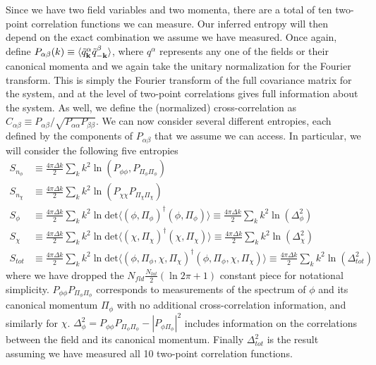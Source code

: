 \documentclass[11pt,a4paper]{article}
\def\det{\mathrm{det}}
\begin{document}
Since we have two field variables and two momenta, there are a total of ten two-point correlation functions we can measure.
Our inferred entropy will then depend on the exact combination we assume we have measured.
Once again, define $P_{\alpha\beta}(k) \equiv \langle \tilde{q}^{\alpha}_{\bf k}\tilde{q}^{\beta}_{-\bf k}\rangle$, where $q^{\alpha}$ represents any one of the fields or their canonical momenta and we again take the unitary normalization for the Fourier transform.
This is simply the Fourier transform of the full covariance matrix for the system, and at the level of two-point correlations gives full information about the system.
As well, we define the (normalized) cross-correlation as $C_{\alpha\beta} \equiv P_{\alpha\beta}/\sqrt{P_{\alpha\alpha}P_{\beta\beta}}$.
We can now consider several different entropies, each defined by the components of $P_{\alpha\beta}$ that we assume we can access.
In particular, we will consider the following five entropies
\begin{align}
  S_{n_\phi}  &\equiv \frac{4\pi\Delta k}{2}\sum_kk^2\ln(P_{\phi\phi},P_{\Pi_\phi\Pi_\phi}) \label{eqn:entropy_nphi} \\
  S_{n_\chi}  &\equiv \frac{4\pi\Delta k}{2}\sum_kk^2\ln(P_{\chi\chi}P_{\Pi_\chi\Pi_\chi}) \label{eqn:entropy_nchi} \\
  S_{\phi}  &\equiv \frac{4\pi\Delta k}{2}\sum_kk^2\ln\det\langle (\phi, \Pi_\phi)^{\dagger}(\phi, \Pi_\phi)\rangle \equiv \frac{4\pi \Delta k}{2}\sum_kk^2\ln(\Delta_\phi^2) \label{eqn:entropy_phi} \\
  S_{\chi}  &\equiv \frac{4\pi\Delta k}{2}\sum_kk^2\ln\det\langle (\chi, \Pi_\chi)^{\dagger}(\chi, \Pi_\chi)\rangle \equiv \frac{4\pi \Delta k}{2}\sum_kk^2\ln(\Delta_\chi^2) \label{eqn:entropy_chi} \\
  S_{tot}   &\equiv \frac{4\pi\Delta k}{2}\sum_k k^2\ln\det\langle (\phi, \Pi_\phi, \chi, \Pi_\chi)^{\dagger}(\phi, \Pi_\phi, \chi, \Pi_\chi)\rangle \equiv \frac{4\pi\Delta k}{2}\sum_kk^2\ln(\Delta_{tot}^2) \label{eqn:entropy_fields_tot}
\end{align}
where we have dropped the $N_{fld}\frac{N_{lat}}{2}(\ln 2\pi + 1)$ constant piece for notational simplicity.
$P_{\phi\phi}P_{\Pi_\phi\Pi_\phi}$ corresponds to measurements of the spectrum of $\phi$ and its canonical momentum $\Pi_\phi$ with no additional cross-correlation information, and similarly for $\chi$.
$\Delta^2_\phi = P_{\phi\phi}P_{\Pi_\phi\Pi_\phi} - |P_{\phi\Pi_\phi}|^2$ includes information on the correlations between the field and its canonical momentum.
Finally $\Delta^2_{tot}$ is the result assuming we have measured all 10 two-point correlation functions.
\end{document}
